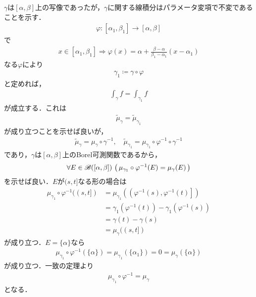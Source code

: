 	$\gamma$は$[\alpha,\beta]$上の写像であったが，$\gamma$に関する線積分はパラメータ変項で不変であることを示す．
	\begin{align}
		\varphi:[\alpha_1,\beta_1] \longrightarrow [\alpha,\beta]
	\end{align}
	で
	\begin{align}
		x \in [\alpha_1,\beta_1] \Longrightarrow \varphi(x) = \alpha + \frac{\beta-\alpha}{\beta_1-\alpha_1}(x-\alpha_1)
	\end{align}
	なる$\varphi$により
	\begin{align}
		\gamma_1 \coloneqq \gamma \circ \varphi
	\end{align}
	と定めれば，
	\begin{align}
		\int_\gamma f = \int_{\gamma_1} f
	\end{align}
	が成立する．これは
	\begin{align}
		\tilde{\mu}_\gamma = \tilde{\mu}_{\gamma_1}
	\end{align}
	が成り立つことを示せば良いが，
	\begin{align}
		\tilde{\mu}_\gamma = \mu_\gamma \circ \gamma^{-1},
		\quad \tilde{\mu}_{\gamma_1} = \mu_{\gamma_1} \circ \varphi^{-1} \circ \gamma^{-1} 
	\end{align}
	であり，$\gamma$は$[\alpha,\beta]$上のBorel可測関数であるから，
	\begin{align}
		\forall E \in \mathscr{B}([\alpha,\beta])\, 
		\left(\, \mu_{\gamma_1} \circ \varphi^{-1}(E) = \mu_\gamma(E)\, \right)
	\end{align}
	を示せば良い．$E$が$(s,t]$なる形の場合は
	\begin{align}
		\mu_{\gamma_1} \circ \varphi^{-1}((s,t])
		&= \mu_{\gamma_1} \left(\left(\varphi^{-1}(s),\varphi^{-1}(t)\right]\right) \\
		&= \gamma_1\left( \varphi^{-1}(t) \right) - \gamma_1\left( \varphi^{-1}(s) \right) \\
		&= \gamma(t) - \gamma(s) \\
		&= \mu_\gamma((s,t])
	\end{align}
	が成り立つ．$E = \{\alpha\}$なら
	\begin{align}
		\mu_{\gamma_1} \circ \varphi^{-1}(\{\alpha\})
		= \mu_{\gamma_1}(\{\alpha_1\})
		= 0
		= \mu_\gamma(\{\alpha\})
	\end{align}
	が成り立つ．一致の定理より
	\begin{align}
		\mu_{\gamma_1} \circ \varphi^{-1} = \mu_\gamma
	\end{align}
	となる．
	
